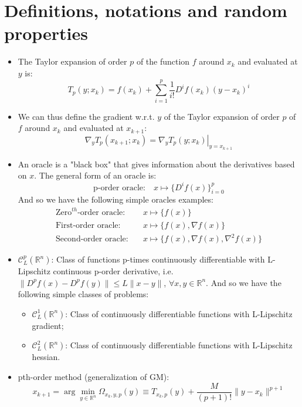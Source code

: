 \documentclass[12pt, openany]{report}
\newcommand{\R}{\mathbb{R}}
\newcommand{\C}{\mathcal{C}}
\theoremstyle{definition}
\begin{document}
\chapter{Definitions, notations and random properties}
\begin{itemize}
	\item The Taylor expansion of order $p$ of the function $f$ around $x_k$ and evaluated at $y$ is: 
	\begin{equation}
		T_p(y;x_k) = f(x_k) + \sum_{i=1}^{p} \frac{1}{i!} D^i f(x_k) (y-x_k)^i
	\end{equation}
	\item We can thus define the gradient w.r.t. $y$ of the Taylor expansion of order $p$ of $f$ around $x_k$ and evaluated at $x_{k+1}$:
	\begin{equation}
		\nabla_y T_p(x_{k+1};x_k) = \left. \nabla_y T_p(y;x_k) \right|_{y=x_{k+1}}
	\end{equation}
	\item An oracle is a "black box" that gives information about the derivatives based on $x$. The general form of an oracle is:
	\begin{equation}
		\text{p-order oracle:} \quad x \mapsto \{D^if(x)\}_{i=0}^p
	\end{equation}
	And so we have the following simple oracles examples:
	\begin{equation}
		\begin{aligned}
			\text{Zero}^{th} \text{-order oracle:} \quad &x \mapsto \{f(x)\} \\
			\text{First-order oracle:} \quad &x \mapsto \{ f(x), \nabla f(x) \} \\
			\text{Second-order oracle:} \quad &x \mapsto \{ f(x), \nabla f(x), \nabla^2 f(x) \}
		\end{aligned}
	\end{equation}
    \item $\C^p_L(\R^n)$: Class of functions p-times continuously differentiable with L-Lipschitz continuous p-order derivative, i.e. $\| D^pf(x) - D^pf(y) \| \leq L \|x-y \|$, $\forall x,y\in \R^n$. And so we have the following simple classes of problems:
    \begin{itemize}
		\item $\C^1_L(\R^n)$: Class of continuously differentiable functions with L-Lipschitz gradient;
    \item $\C^2_L(\R^n)$: Class of continuously differentiable functions with L-Lipschitz hessian.
	\end{itemize}
	\item  pth-order method (generalization of GM):
	\begin{equation}
		x_{k+1} = \arg\min_{y\in \R^n} \Omega_{x_k,y,p}(y) \equiv T_{x_k,p}(y) + \frac{M}{(p+1)!}\|y-x_k\|^{p+1}
	\end{equation}
\end{itemize}
\end{document}
